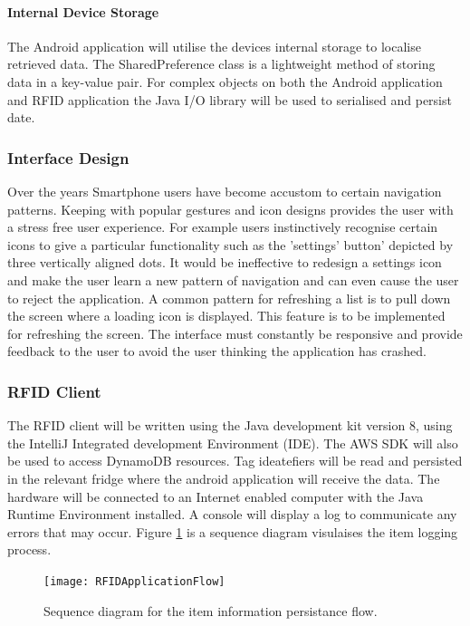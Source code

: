 \documentclass[a4paper, 11pt]{article}
\begin{document}
\paragraph{Internal Device Storage}The Android application will utilise the devices internal storage to localise retrieved data. The SharedPreference class is a lightweight method of storing data in a key-value pair. For complex objects on both the Android application and RFID application the Java I/O library will be used to serialised and persist date.  

\subsubsection {Interface Design}
Over the years Smartphone users have become accustom to certain navigation patterns. Keeping with popular gestures and icon designs provides the user with a stress free user experience. For example users instinctively recognise certain icons to give a particular functionality such as the 'settings' button' depicted by three vertically aligned dots. It would be ineffective to redesign a settings icon and make the user learn a new pattern of navigation and can even cause the user to reject the application. A common pattern for refreshing a list is to pull down the screen where a loading icon is displayed. This feature is to be implemented for refreshing the screen. The interface must constantly be responsive and provide feedback to the user to avoid the user thinking the application has crashed. 

\subsubsection {RFID Client}
The RFID client will be written using the Java development kit version 8, using the IntelliJ Integrated development Environment (IDE). The AWS SDK will also be used to access DynamoDB resources. Tag ideatefiers will be read and persisted in the relevant fridge where the android application will receive the data. The hardware will be connected to an Internet enabled computer with the Java Runtime Environment installed. A console will display a log to communicate any errors that may occur. Figure \ref{fig:RFIDApplicationFlow} is a sequence diagram visulaises the item logging process.

\begin{figure}[!htbp]
\centering
\texttt{[image: RFIDApplicationFlow]}
\caption{Sequence diagram for the item information persistance flow.} \label{fig:RFIDApplicationFlow}
\end{figure}
\end{document}
